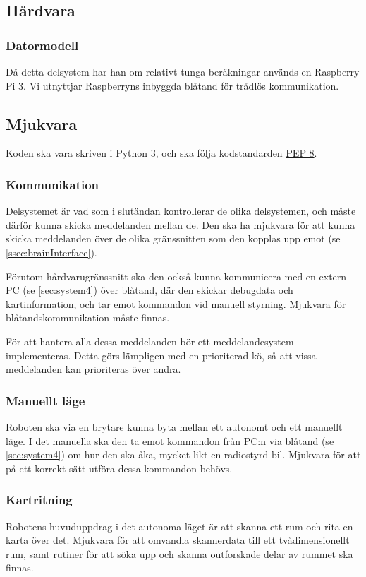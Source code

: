 \documentclass[a4paper,11pt]{article}
\begin{document}
\subsection{Hårdvara}

\subsubsection{Datormodell}
Då detta delsystem har han om relativt tunga beräkningar används en Raspberry Pi 3. Vi utnyttjar Raspberryns inbyggda blåtand för trådlös kommunikation.

\subsection{Mjukvara}
Koden ska vara skriven i Python 3, och ska följa kodstandarden \href{https://www.python.org/dev/peps/pep-0008/}{PEP 8}.

\subsubsection{Kommunikation}
Delsystemet är vad som i slutändan kontrollerar de olika delsystemen, och måste därför kunna skicka meddelanden mellan de. Den ska ha mjukvara för att kunna skicka meddelanden över de olika gränssnitten som den kopplas upp emot (se \ref{ssec:brainInterface}).

Förutom hårdvarugränssnitt ska den också kunna kommunicera med en extern PC (se \ref{sec:system4}) över blåtand, där den skickar debugdata och kartinformation, och tar emot kommandon vid manuell styrning. Mjukvara för blåtandskommunikation måste finnas.

För att hantera alla dessa meddelanden bör ett meddelandesystem implementeras. Detta görs lämpligen med en prioriterad kö, så att vissa meddelanden kan prioriteras över andra.

\subsubsection{Manuellt läge}
Roboten ska via en brytare kunna byta mellan ett autonomt och ett manuellt läge. I det manuella ska den ta emot kommandon från PC:n via blåtand (se \ref{sec:system4}) om hur den ska åka, mycket likt en radiostyrd bil. Mjukvara för att på ett korrekt sätt utföra dessa kommandon behövs.

\subsubsection{Kartritning}
Robotens huvuduppdrag i det autonoma läget är att skanna ett rum och rita en karta över det. Mjukvara för att omvandla skannerdata till ett tvådimensionellt rum, samt rutiner för att söka upp och skanna outforskade delar av rummet ska finnas.
\end{document}
